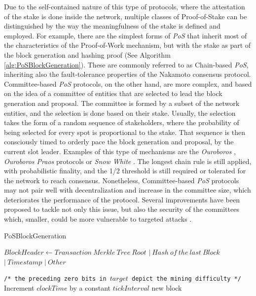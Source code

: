 \documentclass[journal]{IEEEtran}
\newcommand{\LineComment}[1]{\State \texttt{/* #1 */}}
\begin{document}
Due to the self-contained nature of this type of protocols, where the
attestation of the stake is done inside the network, multiple classes
of Proof-of-Stake can be distinguished by the way the meaningfulness of
the stake is defined and employed. For example, there are the simplest forms of \emph{PoS} that inherit most
of the characteristics of the Proof-of-Work mechanism, but with the
stake as part of the block generation and hashing proof (See Algorithm \ref{alg:PoSBlockGeneration}).
These are commonly referred to as Chain-based \emph{PoS}, inheriting also the
fault-tolerance properties of the Nakamoto consensus protocol.
Committee-based \emph{PoS} protocols, on the other hand, are more complex,
and based on the idea of a committee of entities that are 
selected to lead the block generation and proposal. The committee is
formed by a subset of the network entities, and the selection is done
based on their stake. Usually, the selection takes the form of a random
sequence of stakeholders, where the probability of being selected
for every spot is proportional to the stake. That sequence is then 
consciously timed to orderly pace the block generation and proposal, 
by the current slot leader. Examples of this type of mechanisms are
the \emph{Ouroboros} \cite{kiayias2017ouroboros}, \emph{Ouroboros Praos} \cite{david2018ouroboros} protocols
or \emph{Snow White} \cite{daian2019snow}. The longest chain rule is
still applied, with probabilistic finality, and the 1/2 threshold is
still required or tolerated for the network to reach consensus. Nonetheless,
Committee-based \emph{PoS} protocols may not pair well with decentralization and 
increase in the committee size, which deteriorates the performance of the
protocol. Several improvements have been proposed to tackle not only this
issue, but also the security of the committees which, smaller, could be more
vulnerable to targeted attacks \cite{david2018ouroboros}.

\begin{algorithm}
  \caption[short]{PoSBlockGeneration}\label{alg:PoSBlockGeneration}
  \begin{algorithmic}[1]
    \Function {}{}
      \State $Block Header \gets Transaction \ Merkle \ Tree \ Root$
      \Indent
        \State $| \ Hash \ of \ the \ last \ Block$
        \State $| \ Timestamp$
        \State $| \ Other$
      \EndIndent
      
      \LineComment{the preceding zero bits in $target$ depict the mining difficulty}
      \State Increment $clockTime$ by a constant $tickInterval$
      \EndWhile
      \State \Return new block
    \EndFunction
  \end{algorithmic}
\end{algorithm}
  
\end{document}
